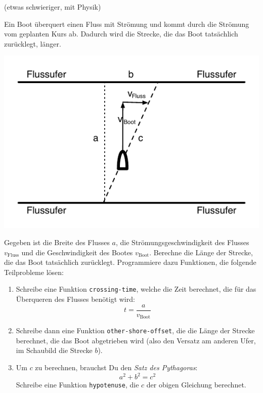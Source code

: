 \begin{aufgabe}  (etwas schwieriger, mit Physik)

  Ein Boot überquert einen Fluss mit Strömung und
  kommt durch die Strömung vom geplanten Kurs ab.  Dadurch wird die
  Strecke, die das Boot tatsächlich zurücklegt, länger.

  \begin{center}
    \includegraphics{elemente/riverboat}
  \end{center}

  Gegeben ist die Breite des Flusses $a$, die Strömungsgeschwindigkeit
  des Flusses $v_{\text{Fluss}}$ und die Geschwindigkeit des Bootes
  $v_{\text{Boot}}$.  Berechne die Länge der Strecke, die das
  Boot tatsächlich zurücklegt.  Programmiere dazu Funktionen, die
  folgende Teilprobleme lösen:

  \begin{enumerate}
  \item Schreibe eine Funktion \lstinline{crossing-time}, welche die
    Zeit berechnet, die für das Überqueren des Flusses benötigt wird:
    \[t = \frac{a}{v_{\text{Boot}}}\]
  \item Schreibe dann eine Funktion \lstinline{other-shore-offset},
    die die Länge der Strecke berechnet, die das Boot abgetrieben wird
    (also den Versatz am anderen Ufer, im Schaubild die Strecke $b$).

  \item Um $c$ zu berechnen, brauchst Du den \textit{Satz des
      Pythagoras}:
    \begin{displaymath}
      a^2 + b^2 = c^2
    \end{displaymath}
    Schreibe eine Funktion \lstinline{hypotenuse},
    die $c$ der obigen Gleichung berechnet.


\end{enumerate}
\end{aufgabe}
